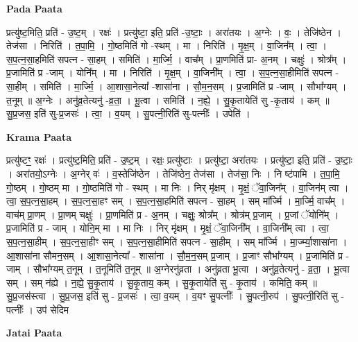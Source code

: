 \documentclass[17pt]{extarticle}
\begin{document}
\textbf{Pada Paata} \newline

प्रत्यु॑ष्ट॒मिति॒ प्रति॑ - उ॒ष्ट॒म् । रक्षः॑ । प्रत्यु॑ष्टा॒ इति॒ प्रति॑ -उ॒ष्टाः॒ । अरा॑तयः । अ॒ग्नेः । वः॒ । तेजि॑ष्ठेन । तेज॑सा । निरिति॑ । त॒पा॒मि॒ । गो॒ष्ठमिति॑ गो -स्थम् । मा । निरिति॑ । मृ॒क्ष॒म् । वा॒जिन᳚म् । त्वा॒ । स॒प॒त्न॒सा॒हमिति॑ सपत्न - सा॒हम् । समिति॑ । मा॒र्ज्मि॒ । वाच᳚म् । प्रा॒णमिति॑ प्रा- अ॒नम् । चक्षुः॑ । श्रोत्र᳚म् । प्र॒जामिति॑ प्र -जाम् । योनि᳚म् । मा । निरिति॑ । मृ॒क्ष॒म् । वा॒जिनी᳚म् । त्वा॒ । स॒प॒त्न॒सा॒हीमिति॑ सपत्न - सा॒हीम् । समिति॑ । मा॒र्ज्मि॒ । आ॒शासा॒नेत्या᳚ -शासा॑ना । सौ॒म॒न॒सम् । प्र॒जामिति॑ प्र -जाम् । सौभा᳚ग्यम् । त॒नूम् ॥ अ॒ग्नेः । अनु॑व्र॒तेत्यनु॑ -व्र॒ता॒ । भू॒त्वा । समिति॑ । न॒ह्ये॒ । सु॒कृ॒तायेति॑ सु -कृ॒ताय॑ । कम् ॥ सु॒प्र॒जस॒ इति॑ सु-प्र॒जसः॑ । त्वा॒ । व॒यम् । सु॒पत्नी॒रिति॑ सु-पत्नीः᳚ । उपेति॑ ।  \newline


\textbf{Krama Paata} \newline

प्रत्यु॑ष्टꣳ॒॒ रक्षः॑ । प्रत्यु॑ष्ट॒मिति॒ प्रति॑ - उ॒ष्ट॒म् । रक्षः॒ प्रत्यु॑ष्टाः । प्रत्यु॑ष्टा॒ अरा॑तयः । प्रत्यु॑ष्टा॒ इति॒ प्रति॑ - उ॒ष्टाः॒ । अरा॑तयो॒ऽग्नेः । अ॒ग्नेर् वः॑ । व॒स्तेजि॑ष्ठेन । तेजि॑ष्ठेन॒ तेज॑सा । तेज॑सा॒ निः । 
नि ष्ट॑पामि । त॒पा॒मि॒ गो॒ष्ठम् । गो॒ष्ठम् मा । गो॒ष्ठमिति॑ गो - स्थम् । मा निः । निर् मृ॑क्षम् । मृ॒क्षं॒ ॅवा॒जिन᳚म् । वा॒जिन॑म् त्वा । त्वा॒ स॒प॒त्न॒सा॒हम् । स॒प॒त्न॒सा॒हꣳ सम् । स॒प॒त्न॒सा॒हमिति॑ सपत्न - सा॒हम् । सम् मा᳚र्ज्मि । मा॒र्ज्मि॒ वाच᳚म् । वाच॑म् प्रा॒णम् । प्रा॒णम् चक्षुः॑ । प्रा॒णमिति॑ प्र - अ॒नम् । चक्षुः॒ श्रोत्र᳚म् । श्रोत्र॑म् प्र॒जाम् । प्र॒जां ॅयोनि᳚म् । प्र॒जामिति॑ प्र - जाम् । योनि॒म् मा । मा निः । निर् मृ॑क्षम् । मृ॒क्षं॒ ॅवा॒जिनी᳚म् । वा॒जिनी᳚म् त्वा । त्वा॒ स॒प॒त्न॒सा॒हीम् । स॒प॒त्न॒सा॒हीꣳ सम् । स॒प॒त्न॒सा॒हीमिति॑ सपत्न - सा॒हीम् । सम् मा᳚र्ज्मि । मा॒र्ज्म्या॒शासा॑ना । आ॒शासा॑ना सौमन॒सम् । आ॒शासा॒नेत्या᳚ - शासा॑ना । सौ॒म॒न॒सम् प्र॒जाम् । प्र॒जाꣳ सौभा᳚ग्यम् । प्र॒जामिति॑ प्र - जाम् । सौभा᳚ग्यम् त॒नूम् । त॒नूमिति॑ त॒नूम् ॥ अ॒ग्नेरनु॑व्रता । अनु॑व्रता भू॒त्वा । अनु॑व्र॒तेत्यनु॑ - व्र॒ता॒ । भू॒त्वा सम् । सम् न॑ह्ये । न॒ह्ये॒ सु॒कृ॒ताय॑ । सु॒कृ॒ताय॒ कम् । सु॒कृ॒तायेति॑ सु - कृ॒ताय॑ । कमिति॒ कम् ॥ सु॒प्र॒जस॑स्त्वा । सु॒प्र॒जस॒ इति॑ सु - प्र॒जसः॑ । त्वा॒ व॒यम् । व॒यꣳ सु॒पत्नीः᳚ । सु॒पत्नी॒रुप॑ । सु॒पत्नी॒रिति॑ सु - पत्नीः᳚ । उप॑ सेदिम \newline

\textbf{Jatai Paata} \newline
\end{document}
